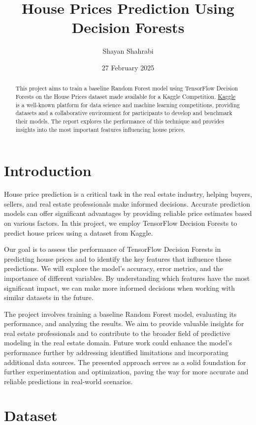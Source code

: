 \documentclass{article}
\title{House Prices Prediction Using Decision Forests}
\author{Shayan Shahrabi}
\date{27 February 2025}
\begin{document}
\maketitle

\begin{abstract}
This project aims to train a baseline Random Forest model using TensorFlow Decision Forests on the House Prices dataset made available for a Kaggle Competition. \href{https://www.kaggle.com/}{Kaggle} is a well-known platform for data science and machine learning competitions, providing datasets and a collaborative environment for participants to develop and benchmark their models. The report explores the performance of this technique and provides insights into the most important features influencing house prices.
\end{abstract}


\section{Introduction}
House price prediction is a critical task in the real estate industry, helping buyers, sellers, and real estate professionals make informed decisions. Accurate prediction models can offer significant advantages by providing reliable price estimates based on various factors. In this project, we employ TensorFlow Decision Forests to predict house prices using a dataset from Kaggle.

Our goal is to assess the performance of TensorFlow Decision Forests in predicting house prices and to identify the key features that influence these predictions. We will explore the model's accuracy, error metrics, and the importance of different variables. By understanding which features have the most significant impact, we can make more informed decisions when working with similar datasets in the future.

The project involves training a baseline Random Forest model, evaluating its performance, and analyzing the results. We aim to provide valuable insights for real estate professionals and to contribute to the broader field of predictive modeling in the real estate domain. Future work could enhance the model's performance further by addressing identified limitations and incorporating additional data sources. The presented approach serves as a solid foundation for further experimentation and optimization, paving the way for more accurate and reliable predictions in real-world scenarios.


\section{Dataset}
\end{document}
